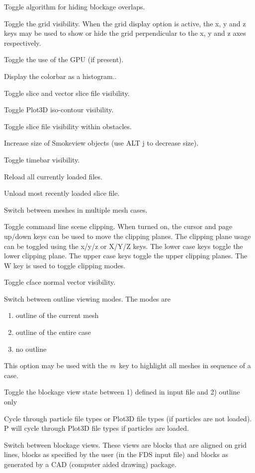 \documentclass[11pt,twoside]{book}
\newcommand{\kitem}[1]{\item[{\bf {\tt #1 \  }} \hfill]}
\begin{document}
\kitem{F}Toggle algorithm for hiding blockage overlaps.

\kitem{g}Toggle the grid visibility.  When the grid display option
is active, the x, y and z keys may be used to show or hide the
grid perpendicular to the x, y and z axes respectively.

\kitem{G}Toggle the use of the GPU (if present).

\kitem{h}Display the colorbar as a histogram..

\kitem{H}Toggle slice and vector slice file  visibility.

\kitem{i}Toggle Plot3D iso-contour visibility.

\kitem{I}Toggle slice file visibility within obstacles.

\kitem{j,J}Increase size of Smokeview objects (use ALT j to decrease size).

\kitem{k,K}Toggle timebar visibility.

\kitem{l}Reload all currently loaded files.

\kitem{L}Unload most recently loaded slice file.


\kitem{m}Switch between meshes in multiple mesh cases.

\kitem{M}Toggle command line scene clipping.  When turned on, the
cursor and page up/down keys can be used to move the clipping planes.
The clipping plane usage can be toggled using the x/y/z or X/Y/Z keys.
The lower case keys toggle the lower clipping plane.  The upper case
keys toggle the upper clipping planes.
The W key is used to toggle clipping modes.

\kitem{n,N}Toggle cface normal vector visibility.

\kitem{o}Switch between outline viewing modes. The modes are
\begin{enumerate}
\item outline of the current mesh
\item outline of the entire case
\item no outline
\end{enumerate}
This option may be used with the {\em m}\ key to highlight all meshes in sequence of a case.

\kitem{O}Toggle the blockage view state between 1) defined in input file and 2) outline only

\kitem{p, P}Cycle through particle file types or Plot3D file types (if particles are not loaded).
P will cycle through Plot3D file types if particles are loaded.

\kitem{q}Switch between blockage views.  These views are blocks
that are aligned on grid lines, blocks as specified by the user
(in the FDS input file) and blocks as generated by a CAD (computer
aided drawing) package.
\end{document}
